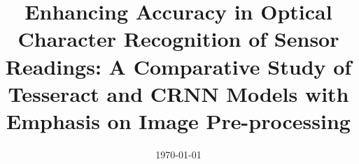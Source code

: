 \documentclass[a4paper, 11pt, oneside]{Thesis}  %
\begin{document}
\frontmatter      %

\title  {Enhancing Accuracy in Optical Character Recognition of Sensor Readings: A Comparative Study of Tesseract and CRNN Models with Emphasis on Image Pre-processing}

\addresses  {\groupname\\\deptname\\\univname}  %
\date       {\today}
\subject    {}
\keywords   {}

\maketitle


\fancyhead{}  %
\rhead{\thepage}  %
\lhead{}  %

\pagestyle{fancy}  %
\end{document}
